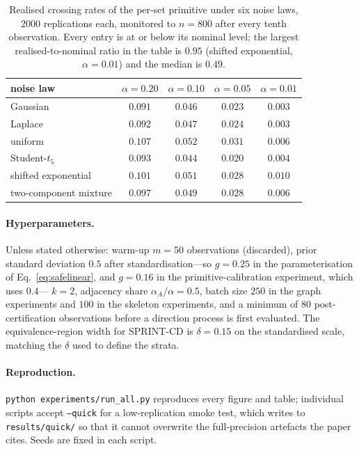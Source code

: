 \begin{appendices}
\begin{table}[h]
\centering
\caption{Realised crossing rates of the per-set primitive under six noise
laws, $2000$ replications each, monitored to $n = 800$ after every tenth
observation. Every entry is at or below its nominal level; the largest
realised-to-nominal ratio in the table is $0.95$ (shifted exponential,
$\alpha = 0.01$) and the median is $0.49$.}%
\label{tab:primitive}
\begin{tabular}{@{}lcccc@{}}
\toprule
noise law & $\alpha=0.20$ & $\alpha=0.10$ & $\alpha=0.05$ & $\alpha=0.01$ \\
\midrule
Gaussian            & $0.091$ & $0.046$ & $0.023$ & $0.003$ \\
Laplace             & $0.092$ & $0.047$ & $0.024$ & $0.003$ \\
uniform             & $0.107$ & $0.052$ & $0.031$ & $0.006$ \\
Student-$t_5$       & $0.093$ & $0.044$ & $0.020$ & $0.004$ \\
shifted exponential & $0.101$ & $0.051$ & $0.028$ & $0.010$ \\
two-component mixture & $0.097$ & $0.049$ & $0.028$ & $0.006$ \\
\bottomrule
\end{tabular}
\end{table}

\paragraph{Hyperparameters.} Unless stated otherwise: warm-up $m = 50$
observations (discarded), prior standard deviation $0.5$ after
standardisation---so $g = 0.25$ in the parameterisation of
Eq.~\eqref{eq:safelinear}, and $g = 0.16$ in the primitive-calibration
experiment, which uses $0.4$---
$k = 2$, adjacency share $\alpha_A/\alpha = 0.5$, batch size $250$ in the
graph experiments and $100$ in the skeleton experiments, and a minimum of $80$
post-certification observations before a direction process is first evaluated.
The equivalence-region width for SPRINT-CD is $\delta = 0.15$ on the
standardised scale, matching the $\delta$ used to define the strata.

\paragraph{Reproduction.} \texttt{python experiments/run\_all.py} reproduces
every figure and table; individual scripts accept \texttt{--quick} for a
low-replication smoke test, which writes to \texttt{results/quick/} so that it
cannot overwrite the full-precision artefacts the paper cites. Seeds are fixed
in each script.

\end{appendices}




